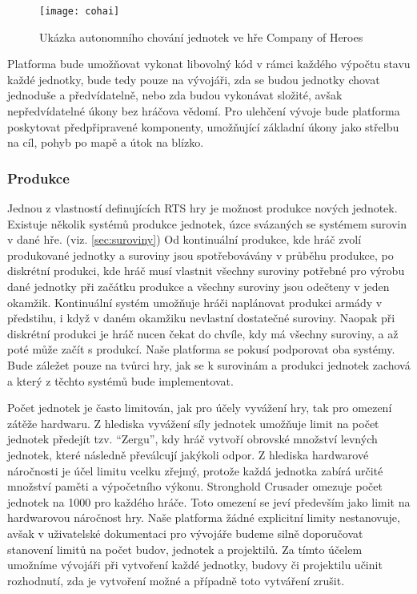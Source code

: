 \begin{figure}[h]	
	\centering
	\texttt{[image: cohai]}
	\caption{Ukázka autonomního chování jednotek ve hře Company of Heroes}
	\label{fig:cohai}
\end{figure}

Platforma bude umožňovat vykonat libovolný kód v rámci každého výpočtu stavu každé jednotky, bude tedy pouze na vývojáři, zda se budou jednotky chovat jednoduše a předvídatelně, nebo zda budou vykonávat složité, avšak nepředvídatelné úkony bez hráčova vědomí. Pro ulehčení vývoje bude platforma poskytovat předpřipravené komponenty, umožňující základní úkony jako střelbu na cíl, pohyb po mapě a útok na blízko.

\subsubsection{Produkce}

Jednou z vlastností definujících RTS hry je možnost produkce nových jednotek. Existuje několik systémů produkce jednotek, úzce svázaných se systémem surovin v dané hře. (viz. \ref{sec:suroviny})  Od kontinuální produkce, kde hráč zvolí produkované jednotky a suroviny jsou spotřebovávány v průběhu produkce, po diskrétní produkci, kde hráč musí vlastnit všechny suroviny potřebné pro výrobu dané jednotky při začátku produkce a všechny suroviny jsou odečteny v jeden okamžik. Kontinuální systém umožňuje hráči naplánovat produkci armády v předstihu, i když v daném okamžiku nevlastní dostatečné suroviny. Naopak při diskrétní produkci je hráč nucen čekat do chvíle, kdy má všechny suroviny, a až poté může začít s produkcí. Naše platforma se pokusí podporovat oba systémy. Bude záležet pouze na tvůrci hry, jak se k surovinám a produkci jednotek zachová a který z těchto systémů bude implementovat.

Počet jednotek je často limitován, jak pro účely vyvážení hry, tak pro omezení zátěže hardwaru. Z hlediska vyvážení síly jednotek umožňuje limit na počet jednotek předejít tzv. ``Zergu'', kdy hráč vytvoří obrovské množství levných jednotek, které následně převálcují jakýkoli odpor. Z hlediska hardwarové náročnosti je účel limitu vcelku zřejmý, protože každá jednotka zabírá určité množství paměti a výpočetního výkonu. Stronghold Crusader omezuje počet jednotek na 1000 pro každého hráče. Toto omezení se jeví především jako limit na hardwarovou náročnost hry. Naše platforma žádné explicitní limity nestanovuje, avšak v uživatelské dokumentaci pro vývojáře budeme silně doporučovat stanovení limitů na počet budov, jednotek a projektilů. Za tímto účelem umožníme vývojáři při vytvoření každé jednotky, budovy či projektilu učinit rozhodnutí, zda je vytvoření možné a případně toto vytváření zrušit. 

